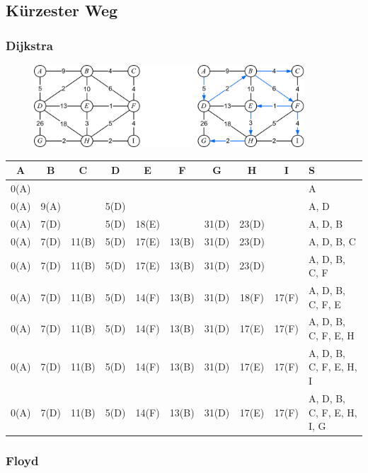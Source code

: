 \subsection{Kürzester Weg}

\subsubsection*{Dijkstra}

\begin{figure}[h]
\centering
\includegraphics[width=0.9\textwidth]{graphics/dijkstra.png}
\end{figure}

\begin{table}[h]
\centering
\begin{tabular}{c|c|c|c|c|c|c|c|c||l}
A & B & C & D & E & F & G & H & I & S\\
\hline
0(A) &      & & & & & & & & A\\
0(A) & 9(A) &       & 5(D) & & & & & & A, D\\
0(A) & 7(D) &       & 5(D) & 18(E) & & 31(D) & 23(D) & & A, D, B\\
0(A) & 7(D) & 11(B) & 5(D) & 17(E) & 13(B) & 31(D) & 23(D) & & A, D, B, C\\
0(A) & 7(D) & 11(B) & 5(D) & 17(E) & 13(B) & 31(D) & 23(D) & & A, D, B, C, F\\
0(A) & 7(D) & 11(B) & 5(D) & 14(F) & 13(B) & 31(D) & 18(F) & 17(F) & A, D, B, C, F, E\\
0(A) & 7(D) & 11(B) & 5(D) & 14(F) & 13(B) & 31(D) & 17(E) & 17(F) & A, D, B, C, F, E, H\\
0(A) & 7(D) & 11(B) & 5(D) & 14(F) & 13(B) & 31(D) & 17(E) & 17(F) & A, D, B, C, F, E, H, I\\
0(A) & 7(D) & 11(B) & 5(D) & 14(F) & 13(B) & 31(D) & 17(E) & 17(F) & A, D, B, C, F, E, H, I, G
\end{tabular}
\end{table}

\newpage

\subsubsection*{Floyd}


